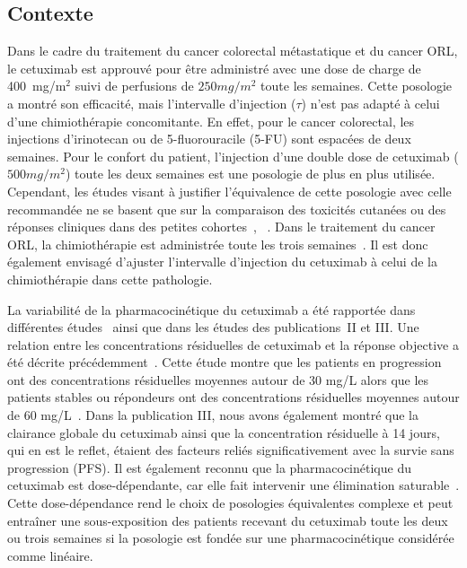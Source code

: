 \subsection{Contexte}
Dans le cadre du traitement du cancer colorectal métastatique et du cancer ORL, le cetuximab est approuvé pour être administré avec une dose de charge de 400~mg/m$^2$ suivi de perfusions de $250 mg/m^2$ toute les semaines. Cette posologie a montré son efficacité, mais l'intervalle d'injection ($\tau$) n'est pas adapté à celui d'une chimiothérapie concomitante. En effet, pour le cancer colorectal, les injections d'irinotecan ou de 5-fluorouracile (5-FU) sont espacées de deux semaines. Pour le confort du patient, l'injection d'une double dose de cetuximab ($500 mg/m^2$) toute les deux semaines est une posologie de plus en plus utilisée. Cependant, les études visant à justifier l'équivalence de cette posologie avec celle recommandée ne se basent que sur la comparaison des toxicités cutanées ou des réponses cliniques dans des petites cohortes~\citep{REF118}, ~\citep{REF136, REF137, REF138}. Dans le traitement du cancer ORL, la chimiothérapie est administrée toute les trois semaines~\citep{REF105, REF106}. Il est donc également envisagé d'ajuster l'intervalle d'injection du cetuximab à celui de la chimiothérapie dans cette pathologie. 

La variabilité de la pharmacocinétique du cetuximab a été rapportée dans différentes études~\citep{REF68, REF122} ainsi que dans les études des publications~II et III. Une relation entre les concentrations résiduelles de cetuximab et la réponse objective a été décrite précédemment~\citep{REF122}. Cette étude montre que les patients en progression ont des concentrations résiduelles moyennes autour de 30 mg/L alors que les patients stables ou répondeurs ont des concentrations résiduelles moyennes autour de 60 mg/L~\citep{REF122}. Dans la publication III, nous avons également montré que la clairance globale du cetuximab ainsi que la concentration résiduelle à 14 jours, qui en est le reflet, étaient des facteurs reliés significativement avec la survie sans progression (PFS). Il est également reconnu que la pharmacocinétique du cetuximab est dose-dépendante, car elle fait intervenir une élimination saturable~\citep{REF68, REF118, REF123, REF127, REF128}. Cette dose-dépendance rend le choix de posologies équivalentes complexe et peut entraîner une sous-exposition des patients recevant du cetuximab toute les deux ou trois semaines si la posologie est fondée sur une pharmacocinétique considérée comme linéaire.

